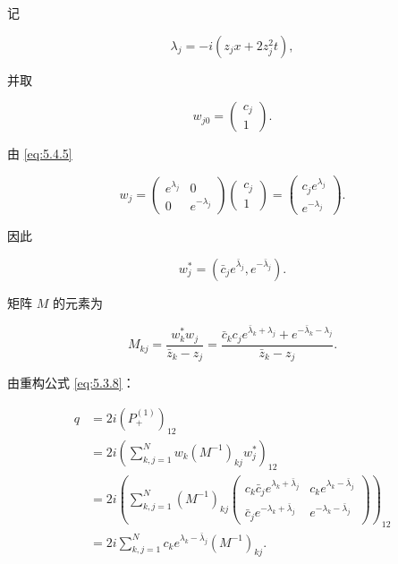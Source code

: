 \documentclass[
    lang=cn,
    scheme=chinese,
    mode=simple,
    device=normal,
    color=blue,
    math=cm,
    thmcnt=section,
    12pt
]{elegantbook}
\begin{document}
记

\[
    \lambda_j
    =
    -i(z_jx+2z_j^2t),
\]

并取

\[
    w_{j0}
    =
    \begin{pmatrix}
        c_j \\1
    \end{pmatrix}.
\]

由 \eqref{eq:5.4.5}

\begin{equation}
    w_j
    =
    \begin{pmatrix}
        e^{\lambda_j} & 0              \\
        0             & e^{-\lambda_j}
    \end{pmatrix}
    \begin{pmatrix}
        c_j \\1
    \end{pmatrix}
    =
    \begin{pmatrix}
        c_je^{\lambda_j} \\
        e^{-\lambda_j}
    \end{pmatrix}.
    \tag{5.4.10}
    \label{eq:5.4.10}
\end{equation}

因此

\begin{equation}
    w_j^*
    =
    \left(
    \bar c_je^{\bar\lambda_j},
    e^{-\bar\lambda_j}
    \right).
    \tag{5.4.11}
    \label{eq:5.4.11}
\end{equation}

矩阵 $M$ 的元素为

\begin{equation}
    M_{kj}
    =
    \dfrac{w_k^*w_j}{\bar z_k-z_j}
    =
    \dfrac{
        \bar c_kc_je^{\bar\lambda_k+\lambda_j}
        +
        e^{-\bar\lambda_k-\lambda_j}
    }{
        \bar z_k-z_j
    }.
    \tag{5.4.12}
    \label{eq:5.4.12}
\end{equation}

由重构公式 \eqref{eq:5.3.8}：

\begin{equation}
    \begin{aligned}
        q
        & =
        2i(P_+^{(1)})_{12} \\
        & =
        2i\left(
        \sum\limits_{k,j=1}^{N}
        w_k(M^{-1})_{kj}w_j^*
        \right)_{12} \\
        & =
        2i\left(
        \sum\limits_{k,j=1}^{N}
        (M^{-1})_{kj}
        \begin{pmatrix}
            c_k\bar c_j e^{\lambda_k+\bar\lambda_j}
            & c_ke^{\lambda_k-\bar\lambda_j} \\
            \bar c_j e^{-\lambda_k+\bar\lambda_j}
            & e^{-\lambda_k-\bar\lambda_j}
        \end{pmatrix}
        \right)_{12} \\
        & =
        2i
        \sum\limits_{k,j=1}^{N}
        c_ke^{\lambda_k-\bar\lambda_j}(M^{-1})_{kj}.
    \end{aligned}
    \tag{5.4.13}
    \label{eq:5.4.13}
\end{equation}
\end{document}
